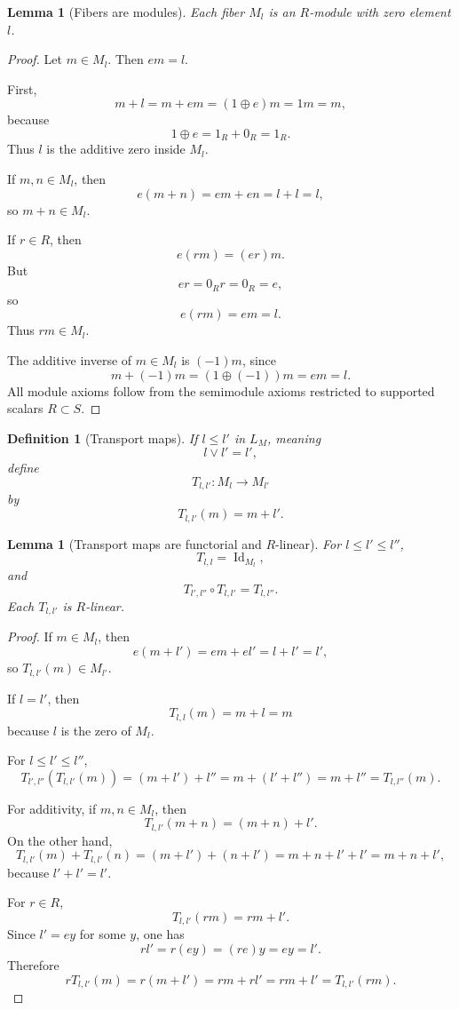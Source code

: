 \documentclass[11pt]{article}
\newtheorem{lemma}[theorem]{Lemma}
\newtheorem{definition}[theorem]{Definition}
\newcommand{\Id}{\operatorname{Id}}
\begin{document}
\begin{lemma}[Fibers are modules]
Each fiber \(M_l\) is an \(R\)-module with zero element \(l\).
\end{lemma}

\begin{proof}
Let \(m\in M_l\). Then \(em=l\).

First,
\[
m+l=m+em=(1\oplus e)m=1m=m,
\]
because
\[
1\oplus e=1_R+0_R=1_R.
\]
Thus \(l\) is the additive zero inside \(M_l\).

If \(m,n\in M_l\), then
\[
e(m+n)=em+en=l+l=l,
\]
so \(m+n\in M_l\).

If \(r\in R\), then
\[
e(rm)=(er)m.
\]
But
\[
er=0_Rr=0_R=e,
\]
so
\[
e(rm)=em=l.
\]
Thus \(rm\in M_l\).

The additive inverse of \(m\in M_l\) is \((-1)m\), since
\[
m+(-1)m=(1\oplus(-1))m=e m=l.
\]
All module axioms follow from the semimodule axioms restricted to supported scalars \(R\subset S\).
\end{proof}

\begin{definition}[Transport maps]
If \(l\le l'\) in \(L_M\), meaning
\[
l\vee l'=l',
\]
define
\[
T_{l,l'}:M_l\to M_{l'}
\]
by
\[
T_{l,l'}(m)=m+l'.
\]
\end{definition}

\begin{lemma}[Transport maps are functorial and \(R\)-linear]
For \(l\le l'\le l''\),
\[
T_{l,l}=\Id_{M_l},
\]
and
\[
T_{l',l''}\circ T_{l,l'}=T_{l,l''}.
\]
Each \(T_{l,l'}\) is \(R\)-linear.
\end{lemma}

\begin{proof}
If \(m\in M_l\), then
\[
e(m+l')=em+el'=l+l'=l',
\]
so \(T_{l,l'}(m)\in M_{l'}\).

If \(l=l'\), then
\[
T_{l,l}(m)=m+l=m
\]
because \(l\) is the zero of \(M_l\).

For \(l\le l'\le l''\),
\[
T_{l',l''}(T_{l,l'}(m))
=
(m+l')+l''
=
m+(l'+l'')
=
m+l''
=
T_{l,l''}(m).
\]

For additivity, if \(m,n\in M_l\), then
\[
T_{l,l'}(m+n)=(m+n)+l'.
\]
On the other hand,
\[
T_{l,l'}(m)+T_{l,l'}(n)
=
(m+l')+(n+l')
=
m+n+l'+l'
=
m+n+l',
\]
because \(l'+l'=l'\).

For \(r\in R\),
\[
T_{l,l'}(rm)=rm+l'.
\]
Since \(l'=ey\) for some \(y\), one has
\[
rl'=r(ey)=(re)y=ey=l'.
\]
Therefore
\[
rT_{l,l'}(m)=r(m+l')=rm+rl'=rm+l'=T_{l,l'}(rm).
\]
\end{proof}
\end{document}
